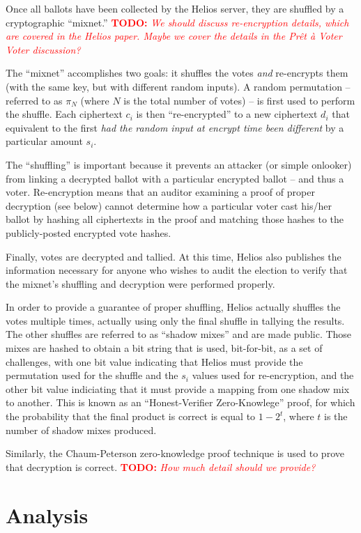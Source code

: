 \documentclass[10pt]{article}
\newcommand{\todo}[1]{\textcolor{red}{\textbf{TODO:} \emph{#1}}}
\newcommand{\preta}{Pr\^{e}t \`{a}}
\newcommand{\pv}{\preta{} Voter}
\begin{document}
\begin{multicols}{2}
Once all ballots have been collected by the Helios server, they are shuffled by a cryptographic
``mixnet.'' \todo{We should discuss re-encryption details, which are covered in the Helios paper.
Maybe we cover the details in the \pv{} Voter discussion?}

The ``mixnet'' accomplishes two goals: it shuffles the votes \emph{and} re-encrypts them (with the
same key, but with different random inputs). A random permutation -- referred to as $\pi_{N}$ (where
$N$ is the total number of votes) -- is first used to perform the shuffle. Each ciphertext
$c_{i}$ is then ``re-encrypted'' to a new ciphertext $d_{i}$ that equivalent to the first \emph{had
the random input at encrypt time been different} by a particular amount $s_{i}$.

The ``shuffling'' is important because it prevents an attacker (or simple onlooker) from linking
a decrypted ballot with a particular encrypted ballot -- and thus a voter. Re-encryption means that
an auditor examining a proof of proper decryption (see below) cannot determine how a particular
voter cast his/her ballot by hashing all ciphertexts in the proof and matching those hashes to the
publicly-posted encrypted vote hashes.

Finally, votes are decrypted and tallied. At this time, Helios also publishes the information
necessary for anyone who wishes to audit the election to verify that the mixnet's shuffling and
decryption were performed properly.

In order to provide a guarantee of proper shuffling, Helios actually shuffles the votes multiple
times, actually using only the final shuffle in tallying the results. The other shuffles are
referred to as ``shadow mixes'' and are made public. Those mixes are hashed to obtain a bit string
that is used, bit-for-bit, as a set of challenges, with one bit value indicating that Helios must
provide the permutation used for the shuffle and the $s_{i}$ values used for re-encryption, and the
other bit value indiciating that it must provide a mapping from one shadow mix to another. This is
known as an ``Honest-Verifier Zero-Knowlege'' proof, for which the probability that the final
product is correct is equal to $1 - 2^{t}$, where $t$ is the number of shadow mixes produced.

Similarly, the Chaum-Peterson zero-knowledge proof technique is used to prove that decryption is
correct. \todo{How much detail should we provide?}

\section{Analysis}


\end{multicols}
\end{document}

